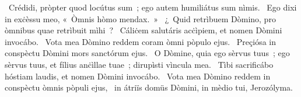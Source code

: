 \psalmChapterWithInscription{}
{ }
{%
~Crédidi, pròpter quod locútus sum~; ego autem humiliátus sum nìmis. 
~Ego dixi in exċèssu meo, «~Òmnis hòmo mendax.~»
~¿~Quid retrìbuem Dòmino, pro òmnibus quae retrìbuit mìhi~? 
~Cáliċem salutáris acċìpiem, et nomen Dòmini invocábo. 
~Vota mea Dòmino reddem coram òmni pòpulo ejus. 
~Preçiósa in conspèctu Dòmini mors sanctórum ejus. 
~O Dòmine, quia ego sèrvus tuus~; ego sèrvus tuus, et fílius anċìllae tuae~; dirupìsti vìncula mea. 
~Tìbi sacrificábo hóstiam laudis, et nomen Dòmini invocábo. 
~Vota mea Dòmino reddem in conspèctu òmnis pòpuli ejus, 
~in átriïs domüs Dòmini, in mèdio tui, Jerozólyma. 
}
